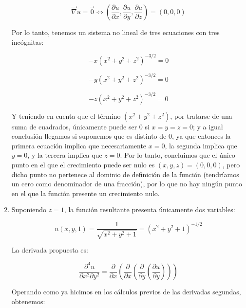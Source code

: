 \documentclass[
  a4paper,
]{scrreport}
\theoremstyle{definition}
\theoremstyle{remark}
\begin{document}
\begin{tcolorbox}
\begin{enumerate}
  \[
  \vec \nabla u = \vec 0 \Leftrightarrow \left( {\frac{{\partial
  u}}{{\partial x}},\frac{{\partial u}}{{\partial y}},\frac{{\partial
  u}}{{\partial z}}} \right) = \left( {0,0,0} \right)
  \]

  Por lo tanto, tenemos un sistema no lineal de tres ecuaciones con tres
  incógnitas:

  \[
  - x\left( {x^2  + y^2  + z^2 } \right)^{ - 3/2}  = 0
  \]

  \[
  - y\left( {x^2  + y^2  + z^2 } \right)^{ - 3/2}  = 0
  \]

  \[
  - z\left( {x^2  + y^2  + z^2 } \right)^{ - 3/2}  = 0
  \]

  Y teniendo en cuenta que el término \((x^2+y^2+z^2)\), por tratarse de
  una suma de cuadrados, únicamente puede ser 0 si \(x=y=z=0\); y a
  igual conclusión llegamos si suponemos que es distinto de 0, ya que
  entonces la primera ecuación implica que necesariamente \(x=0\), la
  segunda implica que \(y=0\), y la tercera implica que \(z=0\). Por lo
  tanto, concluimos que el único punto en el que el crecimiento puede
  ser nulo es \((x,y,z)=(0,0,0)\), pero dicho punto no pertenece al
  dominio de definición de la función (tendríamos un cero como
  denominador de una fracción), por lo que no hay ningún punto en el que
  la función presente un crecimiento nulo.
\item
  Suponiendo \(z=1\), la función resultante presenta únicamente dos
  variables:

  \[
   u(x,y,1) = \frac{1}{{\sqrt {x^2  + y^2  + 1} }} = \left( {x^2  + y^2
   + 1} \right)^{ - 1/2}
   \]

  La derivada propuesta es:

  \[
   \frac{{\partial ^4 u}}{{\partial x^2 \partial y^2 }} =
   \frac{\partial }{{\partial x}}\left( {\frac{\partial }{{\partial
   x}}\left( {\frac{\partial }{{\partial y}}\left( {\frac{{\partial
   u}}{{\partial y}}} \right)} \right)} \right)
   \]

  Operando como ya hicimos en los cálculos previos de las derivadas
  segundas, obtenemos:


\end{enumerate}
\end{tcolorbox}
\end{document}
